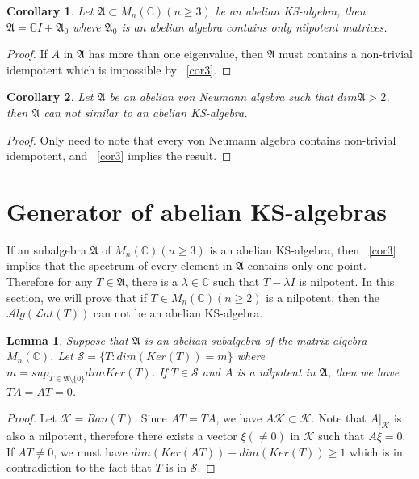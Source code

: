 \documentclass[a4paper,10pt]{amsart}
\newtheorem{corollary}{Corollary}[section]
\newtheorem{lemma}{Lemma}[section]
\theoremstyle{refs}
\newcommand{\AAA}{\mathfrak A}
\newcommand{\Lat}{\mathcal Lat}
\newcommand{\Alg}{\mathcal Alg}
\newcommand{\C}{\mathbb C} %
\begin{document}
\begin{corollary} \label{cor4}
Let $\AAA\subset M_n(\C)(n\geq 3)$ be an abelian
KS-algebra, then $\AAA=\C I+\AAA_{0}$ where $\AAA_{0}$ is an abelian
algebra contains only nilpotent matrices.
\end{corollary}

\begin{proof}
If $A$ in $\AAA$ has more than one eigenvalue, then $\AAA$ must contains
a non-trivial idempotent which is impossible by ~\cref{cor3}.
\end{proof}

\begin{corollary} \label{cor5}
Let $\AAA$ be an abelian von Neumann algebra such that $dim\AAA > 2$, then
$\AAA$ can not similar to an abelian KS-algebra.
\end{corollary}

\begin{proof}
Only need to note that every von Neumann algebra contains non-trivial
idempotent, and ~\cref{cor3} implies the result.
\end{proof}


\section{Generator of abelian KS-algebras}

If an subalgebra $\AAA$ of $M_n(\C)(n \geq 3)$ is an
abelian KS-algebra, then ~\cref{cor3} implies that the spectrum of every element
in $\AAA$ contains only one point. Therefore for any $T \in \AAA$, there is
a $\lambda \in \C$ such that $T - \lambda I$ is nilpotent. In this section, we
will prove that if $T \in M_n(\C)(n \geq 2)$ is a nilpotent, then
the $\Alg(\Lat(T))$ can not be an abelian KS-algebra.


\begin{lemma} \label{lma8}
Suppose that $\AAA$ is an abelian subalgebra of the matrix algebra $M_n(\C)$.
Let $\mathcal{S}=\{T : dim(Ker(T)) = m \}$ where $m = sup_{T \in \AAA
\setminus \{0\}} dimKer(T)$.
If $T \in \mathcal{S}$ and $A$ is a nilpotent in $\AAA$, then we have $TA=AT=0$.
\end{lemma}

\begin{proof}
Let $\mathcal{K} = Ran(T)$. Since $AT = TA$, we have $A\mathcal{K} \subset
\mathcal{K}$. Note that
$A|_{\mathcal{K}}$ is also a nilpotent, therefore
there exists a vector $\xi (\neq 0)$ in $\mathcal{K}$ such that $A\xi = 0$. If
$AT
\neq 0$, we must have
$dim(Ker(AT)) - dim(Ker(T)) \geq 1$ which is in contradiction to the fact that
$T$ is
in $\mathcal{S}$.
\end{proof}
\end{document}
